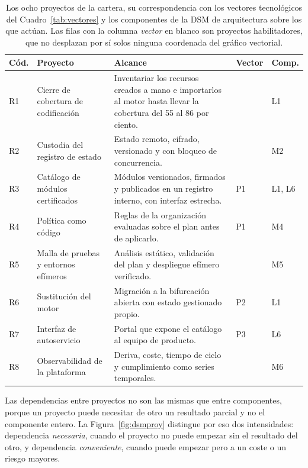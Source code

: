 \documentclass[11pt,letterpaper]{article}
\begin{document}
\begin{table}[htbp]
  \centering
  \footnotesize
  \caption{Los ocho proyectos de la cartera, su correspondencia con los
  vectores tecnológicos del Cuadro~\ref{tab:vectores} y los componentes de la
  DSM de arquitectura sobre los que actúan. Las filas con la columna
  \emph{vector} en blanco son proyectos habilitadores, que no desplazan por sí
  solos ninguna coordenada del gráfico vectorial.}
  \label{tab:dsmproy}
  \begin{tabularx}{\textwidth}{@{}l>{\raggedright\arraybackslash}p{}
    >{\raggedright\arraybackslash}X l l@{}}
    \toprule
    \textbf{Cód.} & \textbf{Proyecto} & \textbf{Alcance} & \textbf{Vector} &
      \textbf{Comp.} \\
    \midrule
    R1 & Cierre de cobertura de codificación & Inventariar los recursos
         creados a mano e importarlos al motor hasta llevar la cobertura del
         55 al 86 por ciento. & & L1 \\
    R2 & Custodia del registro de estado & Estado remoto, cifrado, versionado
         y con bloqueo de concurrencia. & & M2 \\
    R3 & Catálogo de módulos certificados & Módulos versionados, firmados y
         publicados en un registro interno, con interfaz estrecha. & P1 &
         L1, L6 \\
    R4 & Política como código & Reglas de la organización evaluadas sobre el
         plan antes de aplicarlo. & P1 & M4 \\
    R5 & Malla de pruebas y entornos efímeros & Análisis estático, validación
         del plan y despliegue efímero verificado. & & M5 \\
    R6 & Sustitución del motor & Migración a la bifurcación abierta con
         estado gestionado propio. & P2 & L1 \\
    R7 & Interfaz de autoservicio & Portal que expone el catálogo al equipo
         de producto. & P3 & L6 \\
    R8 & Observabilidad de la plataforma & Deriva, coste, tiempo de ciclo y
         cumplimiento como series temporales. & & M6 \\
    \bottomrule
  \end{tabularx}
\end{table}

Las dependencias entre proyectos no son las mismas que entre componentes,
porque un proyecto puede necesitar de otro un resultado parcial y no el
componente entero. La Figura~\ref{fig:dsmproy} distingue por eso dos
intensidades: dependencia \emph{necesaria}, cuando el proyecto no puede
empezar sin el resultado del otro, y dependencia \emph{conveniente}, cuando
puede empezar pero a un coste o un riesgo mayores.
\end{document}
